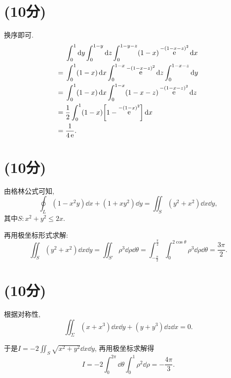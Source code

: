 \documentclass[12pt]{ctexart}
\DeclareMathOperator{\ee}{\mathrm{e}}
\begin{document}
\section{(10分)}
换序即可.
\begin{align*}
	{}&\int_{0}^{1}\dd{y}\int_{0}^{1-y}\dd{z}\int_{0}^{1-y-z}(1-x)\ee^{-(1-x-z)^{2}}\dd{x}\\
	={}&\int_{0}^{1}(1-x)\dd{x}\int_{0}^{1-x}\ee^{-(1-x-z)^{2}}\dd{z}\int_{0}^{1-x-z}\dd{y}\\
	={}&\int_{0}^{1}(1-x)\dd{x}\int_{0}^{1-x}(1-x-z)\ee^{-(1-x-z)^{2}}\dd{z}\\
	={}&\frac{1}{2}\int_{0}^{1}(1-x)\qty[1-\ee^{-(1-x)^{2}}]\dd{x}\\
	={}&\frac{1}{4\ee}.
\end{align*}\par
\section{(10分)}
由格林公式可知,\[
	\oint_{L}(1-x^{2}y)\dd{x}+(1+xy^{2})\dd{y}=\iint_{S}(y^{2}+x^{2})\dd{x}\dd{y},
\]其中\(S: x^{2}+y^{2}\le2x\).\par
再用极坐标形式求解: \[
	\iint_{S}(y^{2}+x^{2})\dd{x}\dd{y}=\iint_{S'}\rho^{3}\dd{\rho}\dd{\theta}=\int_{-\frac{\pi}{2}}^{\frac{\pi}{2}}\int_{0}^{2\cos{\theta}}\rho^{3}\dd{\rho}\dd{\theta}=\frac{3\pi}{2}.
\]
\section{(10分)}
根据对称性,\[
	\iint_{\Sigma}(x+x^{3})\dd{x}\dd{y}+(y+y^{3})\dd{z}\dd{x}=0.
\]\par
于是\(I=-2\iint_{S}\sqrt{x^{2}+y^{2}}\dd{x}\dd{y}\), 再用极坐标求解得\[
	I=-2\int_{0}^{2\pi}\dd{\theta}\int_{0}^{1}\rho^{2}\dd{\rho}=-\frac{4\pi}{3}.
\]
\end{document}
